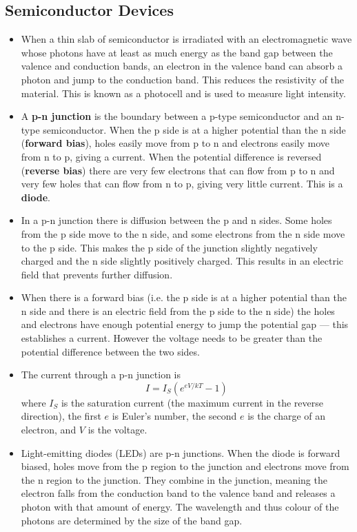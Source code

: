 \documentclass{article}
\begin{document}
\subsection{Semiconductor Devices}

\begin{itemize}
  \item When a thin slab of semiconductor is irradiated with an electromagnetic wave whose photons have at least as much energy as the band gap between the valence and conduction bands, an electron in the valence band can absorb a photon and jump to the conduction band. This reduces the resistivity of the material. This is known as a photocell and is used to measure light intensity.

  \item A \textbf{p-n junction} is the boundary between a p-type semiconductor and an n-type semiconductor. When the p side is at a higher potential than the n side (\textbf{forward bias}), holes easily move from p to n and electrons easily move from n to p, giving a current. When the potential difference is reversed (\textbf{reverse bias}) there are very few electrons that can flow from p to n and very few holes that can flow from n to p, giving very little current. This is a \textbf{diode}.

  \item In a p-n junction there is diffusion between the p and n sides. Some holes from the p side move to the n side, and some electrons from the n side move to the p side. This makes the p side of the junction slightly negatively charged and the n side slightly positively charged. This results in an electric field that prevents further diffusion.

  \item When there is a forward bias (i.e. the p side is at a higher potential than the n side and there is an electric field from the p side to the n side) the holes and electrons have enough potential energy to jump the potential gap — this establishes a current. However the voltage needs to be greater than the potential difference between the two sides.

  \item The current through a p-n junction is \[I = I_S (e^{e V / k T} - 1)\] where $I_S$ is the saturation current (the maximum current in the reverse direction), the first $e$ is Euler's number, the second $e$ is the charge of an electron, and $V$ is the voltage.

  \item Light-emitting diodes (LEDs) are p-n junctions. When the diode is forward biased, holes move from the p region to the junction and electrons move from the n region to the junction. They combine in the junction, meaning the electron falls from the conduction band to the valence band and releases a photon with that amount of energy. The wavelength and thus colour of the photons are determined by the size of the band gap.


\end{itemize}
\end{document}
